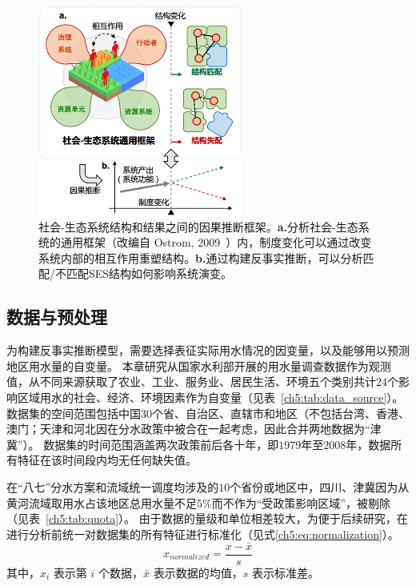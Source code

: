 \begin{figure}[!htb] %
    \centering
    \includegraphics[width=0.6\textwidth]{img/ch5/ch5_framework.png}
    \caption[社会-生态系统结构和结果之间的因果推断框架]{社会-生态系统结构和结果之间的因果推断框架。\textbf{a.}分析社会-生态系统的通用框架（改编自 Ostrom, 2009~\cite{ostrom2009}）内，制度变化可以通过改变系统内部的相互作用重塑结构。\textbf{b.}通过构建反事实推断，可以分析匹配/不匹配SES结构如何影响系统演变。}\label{fig:framework}
\end{figure}

\subsection{数据与预处理}\label{sec:dataset}

为构建反事实推断模型，需要选择表征实际用水情况的因变量，以及能够用以预测地区用水量的自变量。
本章研究从国家水利部开展的用水量调查数据作为观测值，从不同来源获取了农业、工业、服务业、居民生活、环境五个类别共计$24$个影响区域用水的社会、经济、环境因素作为自变量\cite{zhou2020}（见表~\ref{ch5:tab:data_source}）。
数据集的空间范围包括中国$30$个省、自治区、直辖市和地区（不包括台湾、香港、澳门；天津和河北因在分水政策中被合在一起考虑，因此合并两地数据为“津冀”）。
数据集的时间范围涵盖两次政策前后各十年，即$1979$年至$2008$年，数据所有特征在该时间段内均无任何缺失值。



在“八七”分水方案和流域统一调度均涉及的$10$个省份或地区中，四川、津冀因为从黄河流域取用水占该地区总用水量不足$5\%$而不作为“受政策影响区域”，被剔除（见表~\ref{ch5:tab:quota}）。
由于数据的量级和单位相差较大，为便于后续研究，在进行分析前统一对数据集的所有特征进行标准化（见式\ref{ch5:eq:normalization}）。
\begin{equation}
    x_{\textit{normalized}}=\frac{x-\bar{x}}{s}
    \label{ch5:eq:normalization}
\end{equation}
其中，$x_i$ 表示第 $i$ 个数据，$\bar{x}$ 表示数据的均值，$s$ 表示标准差。

